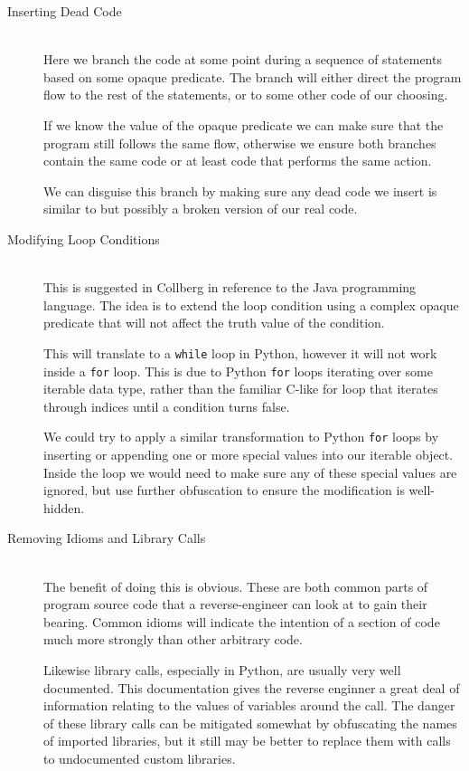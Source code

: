 \documentclass{report}
\begin{document}
\begin{description}
\item[Inserting Dead Code] \hfill \\
Here we branch the code at some point during a sequence of statements based on some opaque predicate. The branch will either
direct the program flow to the rest of the statements, or to some other code of our choosing.

If we know the value of the opaque predicate we can make sure that the program still follows the same flow, otherwise we
ensure both branches contain the same code or at least code that performs the same action.

We can disguise this branch by making sure any dead code we insert is similar to but possibly a broken version of our real code.

\item[Modifying Loop Conditions] \hfill \\
This is suggested in Collberg in reference to the Java programming language. The idea is to extend the loop condition using a
complex opaque predicate that will not affect the truth value of the condition.

This will translate to a \texttt{while} loop in Python, however it will not work inside a \texttt{for} loop. This is due to
Python \texttt{for} loops iterating over some iterable data type, rather than the familiar C-like for loop that iterates
through indices until a condition turns false.

We could try to apply a similar transformation to Python \texttt{for} loops by inserting or appending one or more special values
into our iterable object. Inside the loop we would need to make sure any of these special values are ignored, but use further
obfuscation to ensure the modification is well-hidden.

\item[Removing Idioms and Library Calls] \hfill \\
The benefit of doing this is obvious. These are both common parts of program source code that a reverse-engineer can look at
to gain their bearing. Common idioms will indicate the intention of a section of code much more strongly than other arbitrary
code.

Likewise library calls, especially in Python, are usually very well documented. This documentation gives the reverse enginner
a great deal of information relating to the values of variables around the call. The danger of these library calls can be
mitigated somewhat by obfuscating the names of imported libraries, but it still may be better to replace them with calls
to undocumented custom libraries.


\end{description}
\end{document}
